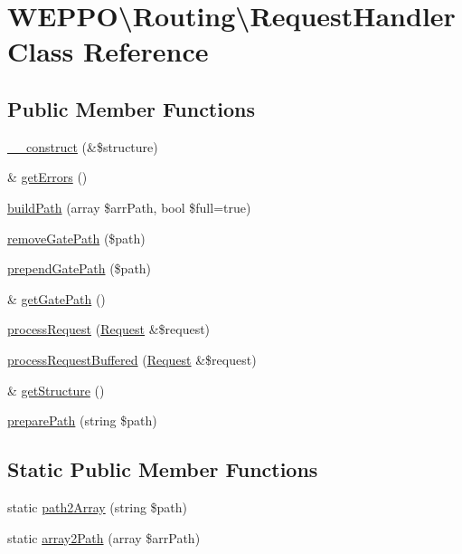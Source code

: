 \hypertarget{classWEPPO_1_1Routing_1_1RequestHandler}{}\section{W\+E\+P\+PO\textbackslash{}Routing\textbackslash{}Request\+Handler Class Reference}
\label{classWEPPO_1_1Routing_1_1RequestHandler}
\subsection*{Public Member Functions}
\begin{DoxyCompactItemize}
\item 
\hyperlink{classWEPPO_1_1Routing_1_1RequestHandler_adfa76d1575861720bd8872265aefc117}{\+\_\+\+\_\+construct} (\&\$structure)
\item 
\& \hyperlink{classWEPPO_1_1Routing_1_1RequestHandler_a7759792e1fd253cffe56cf12196c0677}{get\+Errors} ()
\item 
\hyperlink{classWEPPO_1_1Routing_1_1RequestHandler_af20adb60caa078da7f1cdd8e47655b03}{build\+Path} (array \$arr\+Path, bool \$full=true)
\item 
\hyperlink{classWEPPO_1_1Routing_1_1RequestHandler_aefbf05ae0a9a701d01cc09d26a923862}{remove\+Gate\+Path} (\$path)
\item 
\hyperlink{classWEPPO_1_1Routing_1_1RequestHandler_a2b6e932b267e51551bd6206a39c269c6}{prepend\+Gate\+Path} (\$path)
\item 
\& \hyperlink{classWEPPO_1_1Routing_1_1RequestHandler_a7893df91cb1bfffb062eb382c12b18e6}{get\+Gate\+Path} ()
\item 
\hyperlink{classWEPPO_1_1Routing_1_1RequestHandler_a3e898b9ae66f5c226f66019922093e19}{process\+Request} (\hyperlink{classWEPPO_1_1Routing_1_1Request}{Request} \&\$request)
\item 
\hyperlink{classWEPPO_1_1Routing_1_1RequestHandler_ad31e31ca436f34505f386e6088bc0d7b}{process\+Request\+Buffered} (\hyperlink{classWEPPO_1_1Routing_1_1Request}{Request} \&\$request)
\item 
\& \hyperlink{classWEPPO_1_1Routing_1_1RequestHandler_aa09c60557bcbfce83970045848c5e0cd}{get\+Structure} ()
\item 
\hyperlink{classWEPPO_1_1Routing_1_1RequestHandler_a4aebc3b54214e52690684f7db35a3cde}{prepare\+Path} (string \$path)
\end{DoxyCompactItemize}
\subsection*{Static Public Member Functions}
\begin{DoxyCompactItemize}
\item 
static \hyperlink{classWEPPO_1_1Routing_1_1RequestHandler_a7736e868c03f20211a3dc035ed7d6229}{path2\+Array} (string \$path)
\item 
static \hyperlink{classWEPPO_1_1Routing_1_1RequestHandler_a2b65faf4cbf9602211dca21949ecaa72}{array2\+Path} (array \$arr\+Path)
\end{DoxyCompactItemize}
